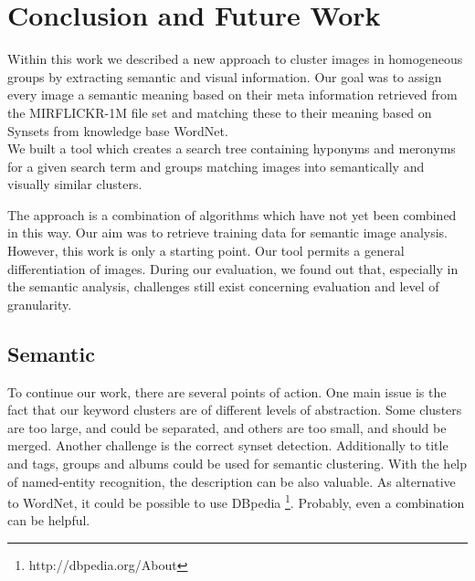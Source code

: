 %
\section{Conclusion and Future Work}
\label{sec_future}


Within this work we described a new approach to cluster images in homogeneous groups by extracting semantic and visual information. Our goal was to assign every image a semantic meaning based on their meta information retrieved from the MIRFLICKR-1M file set and matching these to their meaning based on Synsets from knowledge base WordNet.
\\ We built a tool which creates a search tree containing hyponyms and meronyms for a given search term and groups matching images into semantically and visually similar clusters.

\bigskip
The approach is a combination of algorithms which have not yet been combined in this way. Our aim was to retrieve training data for semantic image analysis. However, this work is only a starting point. Our tool permits a general differentiation of images. During our evaluation, we found out that, especially in the semantic analysis, challenges still exist concerning evaluation and level of granularity.

\subsection{Semantic}
To continue our work, there are several points of action. One main issue is the fact that our keyword clusters are of different levels of abstraction. Some clusters are too large, and could be separated, and others are too small, and should be merged. Another challenge is the correct synset detection. Additionally to title and tags, groups and albums could be used for semantic clustering. With the help of named-entity recognition, the description can be also valuable. As alternative to WordNet, it could be possible to use DBpedia \footnote{http://dbpedia.org/About}. Probably, even a combination can be helpful.

